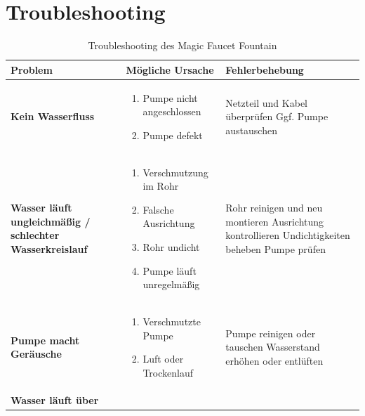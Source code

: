 %
%

\chapter{Troubleshooting}
\begin{table}[h]
	\centering
	\caption{Troubleshooting des Magic Faucet Fountain}
	\renewcommand{\arraystretch}{1.4}
	\begin{tabular}{|m{4.5cm}|m{5.2cm}|m{5cm}|}
		\hline
		\textbf{Problem} & \textbf{Mögliche Ursache} & \textbf{Fehlerbehebung} \\
		\hline
		\textbf{Kein Wasserfluss} 
		& \begin{enumerate}[nosep]
			\item Pumpe nicht angeschlossen
			\item Pumpe defekt
		\end{enumerate}
		& Netzteil und Kabel überprüfen \newline Ggf. Pumpe austauschen \\
		\hline
		\textbf{Wasser läuft ungleichmäßig / schlechter Wasserkreislauf} 
		& \begin{enumerate}[nosep]
			\item Verschmutzung im Rohr
			\item Falsche Ausrichtung
			\item Rohr undicht
			\item Pumpe läuft unregelmäßig
		\end{enumerate}
		& Rohr reinigen und neu montieren \newline Ausrichtung kontrollieren \newline Undichtigkeiten beheben \newline Pumpe prüfen \\
		\hline
		\textbf{Pumpe macht Geräusche} 
		& \begin{enumerate}[nosep]
			\item Verschmutzte Pumpe
			\item Luft oder Trockenlauf
		\end{enumerate}
		& Pumpe reinigen oder tauschen \newline Wasserstand erhöhen oder entlüften \\
		\hline
		\textbf{Wasser läuft über} 
		& \begin{enumerate}[nosep]

\end{enumerate}
\end{tabular}
\end{table}
